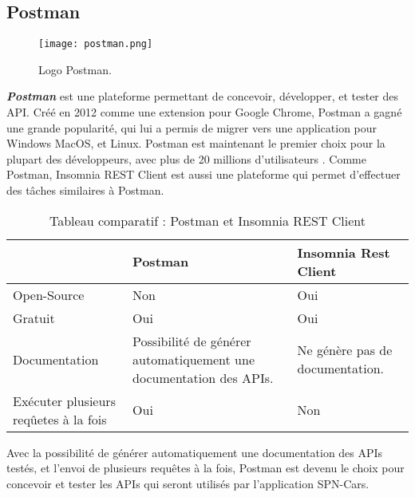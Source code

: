 \subsection{Postman}
\begin{figure}[H]
    \centering
    \texttt{[image: postman.png]}
    \vspace{1cm}
    \captionsetup{justification=centering}
    \caption{Logo Postman.}
    \label{fig:postman_logo}
\end{figure}
\textit{\textbf{Postman}} \cite{postman} est une plateforme permettant de concevoir, développer, et tester des API. Créé en 2012 comme une extension pour Google Chrome, Postman a gagné une grande popularité, qui lui a permis de migrer vers une application pour Windows MacOS, et Linux. Postman est maintenant le premier choix pour la plupart des développeurs, avec plus de 20 millions d'utilisateurs \cite{postman_users}.
Comme Postman, Insomnia REST Client\cite{insomnia} est aussi une plateforme qui permet d'effectuer des tâches similaires à Postman.
\begin{table}[H]
    \begin{tabularx}{\textwidth} {
            | >{\centering\arraybackslash}X
            | >{\centering\arraybackslash}X
            | >{\centering\arraybackslash}X |}
        \hline
                                              & Postman                                                            & Insomnia Rest Client            \\
        \hline
        Open-Source                           & Non                                                                & Oui                             \\
        \hline
        Gratuit                               & Oui                                                                & Oui                             \\
        \hline
        Documentation                         & Possibilité de générer automatiquement une documentation des APIs. & Ne génère pas de documentation. \\
        \hline
        Exécuter plusieurs reqûetes à la fois & Oui                                                                & Non                             \\
        \hline
    \end{tabularx}
    \captionsetup{justification=centering}
    \caption{Tableau comparatif : Postman et Insomnia REST Client}
    \label{tab:comparaison_postman_insomnia}
\end{table}
Avec la possibilité de générer automatiquement une documentation des APIs testés, et l'envoi de plusieurs requêtes à la fois, Postman est devenu le choix pour concevoir et tester les APIs qui seront utilisés par l'application SPN-Cars.
